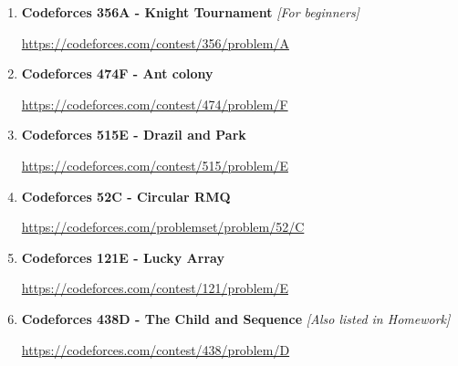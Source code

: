 \documentclass[11pt]{article}
\begin{document}
\begin{enumerate}
    \vspace{0.3em}
    {\small\url{https://codeforces.com/problemset/problem/1234/D}}

    \vspace{0.8em}

    \item \textbf{Codeforces 356A - Knight Tournament}
    \hfill \textit{[For beginners]}

    \vspace{0.3em}
    {\small\url{https://codeforces.com/contest/356/problem/A}}

    \vspace{0.8em}

    \item \textbf{Codeforces 474F - Ant colony}

    \vspace{0.3em}
    {\small\url{https://codeforces.com/contest/474/problem/F}}

    \vspace{0.8em}

    \item \textbf{Codeforces 515E - Drazil and Park}

    \vspace{0.3em}
    {\small\url{https://codeforces.com/contest/515/problem/E}}

    \vspace{0.8em}

    \item \textbf{Codeforces 52C - Circular RMQ}

    \vspace{0.3em}
    {\small\url{https://codeforces.com/problemset/problem/52/C}}

    \vspace{0.8em}

    \item \textbf{Codeforces 121E - Lucky Array}

    \vspace{0.3em}
    {\small\url{https://codeforces.com/contest/121/problem/E}}

    \vspace{0.8em}

    \item \textbf{Codeforces 438D - The Child and Sequence}
    \hfill \textit{[Also listed in Homework]}

    \vspace{0.3em}
    {\small\url{https://codeforces.com/contest/438/problem/D}}


\end{enumerate}
\end{document}
